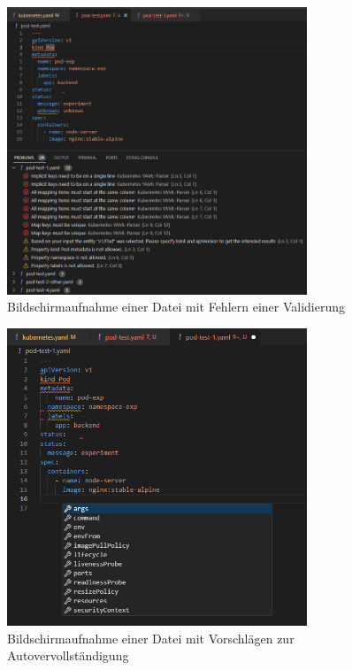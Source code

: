 \begin{figure}[htp] %
  \centering
  \includegraphics[width=0.8\textwidth]{images/screenshot-validation.png} %
  \caption{Bildschirmaufnahme einer Datei mit Fehlern einer Validierung}
  \label{fig:screenshot-validation}
\end{figure}

\begin{figure}[H] %
  \centering
  \includegraphics[width=0.8\textwidth]{images/screenshot-completion.png} %
  \caption{Bildschirmaufnahme einer Datei mit Vorschlägen zur Autovervollständigung}
  \label{fig:screenshot-completion}
\end{figure}




